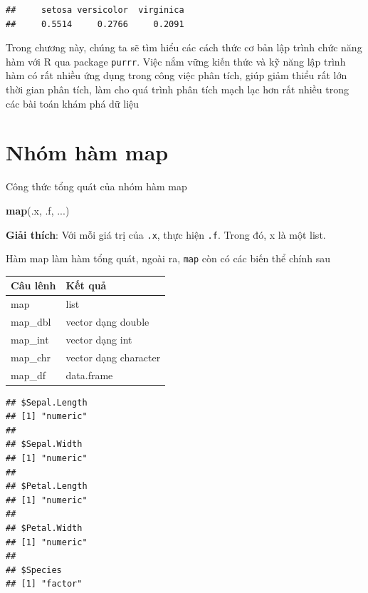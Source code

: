 \documentclass[]{krantz}
\makeatletter
\newenvironment{Shaded}{\begin{snugshade}}{\end{snugshade}}
\newcommand{\CommentTok}[1]{\textcolor[rgb]{0.37,0.37,0.37}{\textit{#1}}}
\newcommand{\KeywordTok}[1]{\textcolor[rgb]{0.27,0.27,0.27}{\textbf{#1}}}
\newcommand{\NormalTok}[1]{#1}
\newcommand{\OperatorTok}[1]{\textcolor[rgb]{0.43,0.43,0.43}{\textbf{#1}}}
\newcommand{\StringTok}[1]{\textcolor[rgb]{0.5,0.5,0.5}{#1}}
\newenvironment{kframe}{%
\medskip{}
\setlength{\fboxsep}{.8em}
 \def\at@end@of@kframe{}%
 \ifinner\ifhmode%
  \def\at@end@of@kframe{\end{minipage}}%
  \begin{minipage}{\columnwidth}%
 \fi\fi%
 \def\FrameCommand##1{\hskip\@totalleftmargin \hskip-\fboxsep
 \colorbox{shadecolor}{##1}\hskip-\fboxsep
     \hskip-\linewidth \hskip-\@totalleftmargin \hskip\columnwidth}%
 \MakeFramed {\advance\hsize-\width
   \@totalleftmargin\z@ \linewidth\hsize
   \@setminipage}}%
 {\par\unskip\endMakeFramed%
 \at@end@of@kframe}
\renewenvironment{Shaded}{\begin{kframe}}{\end{kframe}}
\renewenvironment{Shaded}{\begin{snugshade}}{\end{snugshade}}
\renewcommand{\CommentTok}[1]{\textcolor[rgb]{0.56,0.35,0.01}{\textit{#1}}}
\renewcommand{\KeywordTok}[1]{\textcolor[rgb]{0.13,0.29,0.53}{\textbf{#1}}}
\renewcommand{\NormalTok}[1]{#1}
\renewcommand{\OperatorTok}[1]{\textcolor[rgb]{0.81,0.36,0.00}{\textbf{#1}}}
\renewcommand{\StringTok}[1]{\textcolor[rgb]{0.31,0.60,0.02}{#1}}
\theoremstyle{definition}
\theoremstyle{definition}
\theoremstyle{definition}
\theoremstyle{remark}
\makeatother
\begin{document}
\begin{verbatim}
##     setosa versicolor  virginica 
##     0.5514     0.2766     0.2091
\end{verbatim}

Trong chương này, chúng ta sẽ tìm hiểu các cách thức cơ bản lập trình
chức năng hàm với R qua package \texttt{purrr}. Việc nắm vững kiến thức
và kỹ năng lập trình hàm có rất nhiều ứng dụng trong công việc phân
tích, giúp giảm thiểu rất lớn thời gian phân tích, làm cho quá trình
phân tích mạch lạc hơn rất nhiều trong các bài toán khám phá dữ liệu

\hypertarget{nhom-ham-map}{%
\section{Nhóm hàm map}\label{nhom-ham-map}}

Công thức tổng quát của nhóm hàm map

\begin{Shaded}
\begin{Highlighting}[]
\KeywordTok{map}\NormalTok{(.x, .f, ...)}
\end{Highlighting}
\end{Shaded}

\textbf{Giải thích}: Với mỗi giá trị của \texttt{.x}, thực hiện
\texttt{.f}. Trong đó, x là một list.

Hàm map làm hàm tổng quát, ngoài ra, \texttt{map} còn có các biến thể
chính sau

\begin{longtable}[]{@{}ll@{}}
\toprule
Câu lênh & Kết quả\tabularnewline
\midrule
\endhead
map & list\tabularnewline
map\_dbl & vector dạng double\tabularnewline
map\_int & vector dạng int\tabularnewline
map\_chr & vector dạng character\tabularnewline
map\_df & data.frame\tabularnewline
\bottomrule
\end{longtable}

\begin{Shaded}
\end{Shaded}

\begin{verbatim}
## $Sepal.Length
## [1] "numeric"
## 
## $Sepal.Width
## [1] "numeric"
## 
## $Petal.Length
## [1] "numeric"
## 
## $Petal.Width
## [1] "numeric"
## 
## $Species
## [1] "factor"
\end{verbatim}
\end{document}
